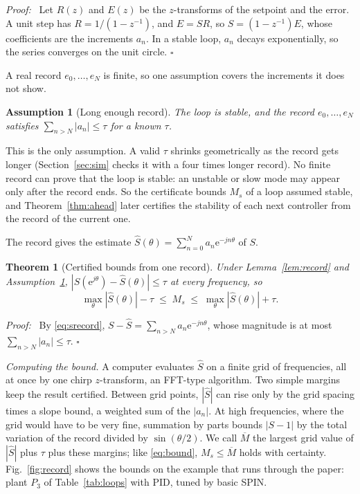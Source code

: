 \documentclass[letterpaper, 10 pt, conference]{ieeeconf}
\newtheorem{theorem}{Theorem}
\newtheorem{assumption}{Assumption}
\renewenvironment{proof}{\noindent\textit{Proof:}\ }{\hfill$\square$\par\smallskip}
\newcommand{\spin}{SPIN\xspace}
\begin{document}
\begin{proof}
Let $R(z)$ and $E(z)$ be the $z$-transforms of the setpoint and the
error. A unit step has $R=1/(1-z^{-1})$, and $E=SR$, so
$S=(1-z^{-1})E$, whose coefficients are the increments $a_n$. In a
stable loop, $a_n$ decays exponentially, so the series converges on the
unit circle.
\end{proof}

A real record $e_0,\dots,e_N$ is finite, so one assumption covers the
increments it does not show.

\begin{assumption}[Long enough record]
\label{ass:tail}
The loop is stable, and the record $e_0,\dots,e_N$ satisfies
$\sum_{n>N}|a_n|\le\tau$ for a known $\tau$.
\end{assumption}

This is the only assumption. A valid $\tau$ shrinks geometrically as the
record gets longer (Section~\ref{sec:sim} checks it with a four times
longer record). No finite record can prove that the loop is stable: an
unstable or slow mode may appear only after the record ends. So the
certificate bounds $M_s$ of a loop assumed stable, and
Theorem~\ref{thm:ahead} later certifies the stability of each next
controller from the record of the current one.

The record gives the estimate
$\hat S(\theta)=\sum_{n=0}^{N}a_n\mathrm{e}^{-jn\theta}$ of $S$.

\begin{theorem}[Certified bounds from one record]
\label{thm:cert}
Under Lemma~\ref{lem:record} and Assumption~\ref{ass:tail},
$|S(\mathrm{e}^{j\theta})-\hat S(\theta)|\le\tau$ at every frequency, so
\begin{equation}
\max_\theta|\hat S(\theta)|-\tau\;\le\;M_s\;\le\;\max_\theta|\hat S(\theta)|+\tau.
\label{eq:bound}
\end{equation}
\end{theorem}

\begin{proof}
By \eqref{eq:srecord}, $S-\hat S=\sum_{n>N}a_n\mathrm{e}^{-jn\theta}$, whose
magnitude is at most $\sum_{n>N}|a_n|\le\tau$.
\end{proof}

\emph{Computing the bound.} A computer evaluates $\hat S$ on a finite
grid of frequencies, all at once by one chirp $z$-transform, an FFT-type
algorithm. Two simple margins keep the result certified. Between grid
points, $|\hat S|$ can rise only by the grid spacing times a slope bound,
a weighted sum of the $|a_n|$. At high frequencies, where the grid would
have to be very fine, summation by parts bounds $|S-1|$ by the total
variation of the record divided by $\sin(\theta/2)$. We call
$\overline M$ the largest grid value of $|\hat S|$ plus $\tau$ plus these
margins; like \eqref{eq:bound}, $M_s\le\overline M$ holds with certainty.
Fig.~\ref{fig:record} shows the bounds on the example that runs through
the paper: plant $P_3$ of Table~\ref{tab:loops} with PID, tuned by basic
\spin.
\end{document}
